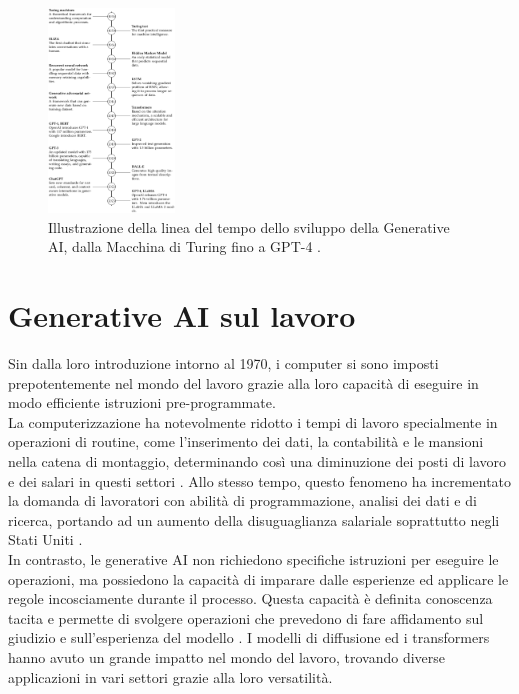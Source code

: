 \begin{figure}[ht]
	\centering
	\includegraphics[width=0.3\textwidth]{Immagini/AI_story.png}
	\caption{Illustrazione della linea del tempo dello sviluppo della Generative AI, dalla Macchina di Turing fino a GPT-4 \cite{zhang2023turing}.}
	\label{fig:Generative_AI_story}
\end{figure}

\section{Generative AI sul lavoro}
Sin dalla loro introduzione intorno al 1970, i computer si sono imposti prepotentemente nel mondo del lavoro grazie alla loro capacità di eseguire in modo efficiente istruzioni pre-programmate.\\
La computerizzazione ha notevolmente ridotto i tempi di lavoro specialmente in  operazioni di routine, come l'inserimento dei dati, la contabilità e le mansioni nella catena di montaggio, determinando così una diminuzione dei posti di lavoro e  dei salari in questi settori \cite{acemoglu2011skills}.
Allo stesso tempo, questo fenomeno ha incrementato la domanda di lavoratori con abilità di programmazione, analisi dei dati e  di ricerca, portando ad un aumento della disuguaglianza salariale soprattutto negli Stati Uniti \cite{katz1992changes}.\\
In contrasto, le generative AI non richiedono specifiche istruzioni per eseguire le operazioni, ma possiedono la capacità di imparare dalle esperienze ed applicare le regole incosciamente durante il processo. Questa capacità è definita conoscenza tacita e permette di svolgere operazioni che prevedono di fare affidamento sul giudizio e sull'esperienza del modello \cite{fischer2009michael} \cite{nguyen2022empirical}.
I modelli di diffusione ed i transformers hanno avuto un grande impatto nel mondo del lavoro, trovando diverse applicazioni in vari settori grazie alla loro versatilità.

